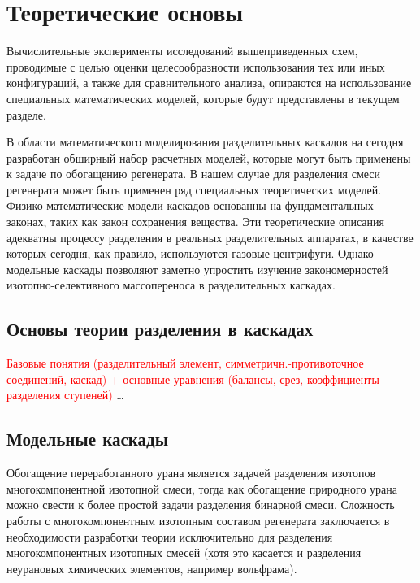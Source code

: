 \section{Теоретические основы}

Вычислительные эксперименты исследований вышеприведенных схем, проводимые с целью оценки целесообразности использования тех или иных конфигураций, а также для сравнительного анализа,  опираются на использование специальных математических моделей, которые будут представлены в текущем разделе.

В области математического моделирования разделительных каскадов на сегодня разработан обширный набор расчетных моделей, которые могут быть применены к задаче по обогащению регенерата. В нашем случае для разделения смеси регенерата может быть применен ряд специальных теоретических моделей. Физико-математические модели каскадов основанны на фундаментальных законах, таких как закон сохранения вещества. Эти теоретические описания адекватны процессу разделения в реальных разделительных аппаратах, в качестве которых сегодня, как правило, используются газовые центрифуги. Однако модельные каскады позволяют заметно упростить изучение закономерностей изотопно-селективного массопереноса в разделительных каскадах.

\subsection{Основы теории разделения в каскадах}
\textcolor{red}{Базовые понятия (разделительный элемент, симметричн.-противоточное соединений, каскад) + основные уравнения (балансы, срез, коэффициенты разделения ступеней)}
\dots

\subsection{Модельные каскады}

Обогащение переработанного урана является задачей разделения изотопов многокомпонентной изотопной смеси, тогда как обогащение природного урана можно свести к более простой задачи разделения бинарной смеси. Сложность работы с многокомпонентным изотопным составом регенерата заключается в необходимости разработки теории исключительно для разделения многокомпонентных изотопных смесей (хотя это касается и разделения неурановых химических элементов, например вольфрама).


